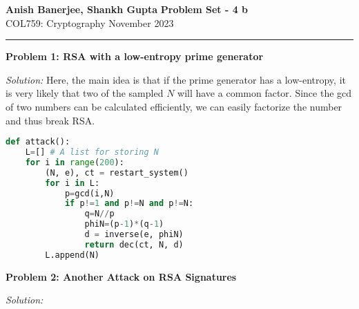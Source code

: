 \documentclass[a4paper, 11pt]{article}
\newcommand{\hr}{\noindent\rule{7in}{2.8pt}}
\newenvironment{solution}
    {\textit{Solution:}}
    {}
\newcommand{\prob}[1]{\begin{mdframed}[backgroundcolor=gray!20] \textbf{Problem #1}\end{mdframed}}
\begin{document}
\noindent
\large\textbf{Anish Banerjee, Shankh Gupta} \hfill \textbf{Problem Set - 4 b}   \\
\normalsize COL759: Cryptography \hfill November 2023\\
\hr


\prob{1: RSA with a low-entropy prime generator}
\begin{solution}
    Here, the main idea is that if the prime generator has a low-entropy, it is very likely that two of the sampled $N$ will have a common factor. Since the gcd of two numbers can be calculated efficiently, we can easily factorize the number and thus break RSA.
    \begin{lstlisting}[language=Python, caption=RSA with a low-entropy prime generator]
def attack():
    L=[] # A list for storing N
    for i in range(200):
        (N, e), ct = restart_system()
        for i in L:
            p=gcd(i,N)
            if p!=1 and p!=N and p!=N:
                q=N//p
                phiN=(p-1)*(q-1)
                d = inverse(e, phiN)
                return dec(ct, N, d)
        L.append(N)
        \end{lstlisting}
\end{solution}

\prob{2: Another Attack on RSA Signatures}
\begin{solution}
    
\end{solution}
\end{document}
